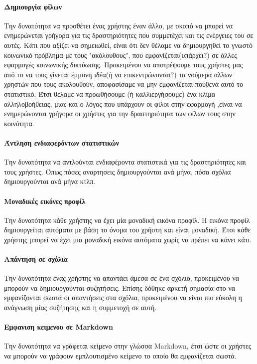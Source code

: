 \documentclass[acmtog, nonacm, language=english, language=greek]{acmart}
\newcommand{\en}[1]{\textlatin{#1}}
\begin{document}
\paragraph{Δημιουργία φίλων} Την δυνατότητα να προσθέτει ένας χρήστης έναν άλλο, με σκοπό να μπορεί να ενημερώνεται γρήγορα για τις δραστηριότητες που συμμετέχει και τις ενέργειες του σε αυτές. Κάτι που αξίζει να σημειωθεί, είναι ότι δεν θέλαμε να δημιουργηθεί το γνωστό κοινωνικό πρόβλημα με τους "ακόλουθους", που εμφανίζεται(υπάρχει?) σε άλλες εφαρμογές κοινωνικής δικτύωσης. Προκειμένου να αποτρέψουμε τους χρήστες μας από το να τους γίνεται έμμονη ιδέα(ή να επικεντρώνονται?) τα νούμερα αλλων χρηστών που τους ακολουθούν, αποφασίσαμε να μην εμφανίζεται πουθενά αυτό το στατιστικό. Έτσι θέλαμε να προωθήσουμε (ή καλλιεργήσουμε) ένα κλίμα αλληλοβοήθειας, μιας και ο λόγος που υπάρχουν οι φίλοι στην εφαρμογή ,είναι να ενημερώνονται γρήγορα οι χρήστες για την δραστηριότητα των φίλων τους στην κοινότητα.

\paragraph{Άντληση ενδιαφερόντων στατιστικών} Την δυνατότητα να αντλούνται ενδιαφέροντα στατιστικά για τις δραστηριότητες και τους χρήστες. Όπως πόσες αναρτησεις δημιουργούνται ανά μήνα, πόσα σχόλια δημιουργούνται ανά μήνα κτλπ.

\paragraph{Μοναδικές εικόνες προφίλ} Την δυνατότητα κάθε χρήστης να έχει μία μοναδική εικόνα προφίλ. Η εικόνα προφίλ  δημιουργείται αυτόματα με βάση το όνομα του χρήστη και είναι μοναδική. Έτσι κάθε χρήστης μπορεί να έχει μια μοναδική εικόνα αυτόματα χωρίς να πρέπει να κάνει κάτι.

\paragraph{Απάντηση σε σχόλια} Την δυνατότητα ένας χρήστης να απαντάει άμεσα σε ένα σχόλιο, προκειμένου να μπορούν να δημιουργούνται συζητήσεις. Επίσης δόθηκε αρκετή σημασία στο να εμφανίζονται σωστά οι απαντήσεις στα σχόλια, προκειμένου να είναι πιο εύκολη η ανάγνωση μίας συζήτησης και η συμμετοχή σε αυτή.

\paragraph{Εμφανιση κειμενου σε \en{Markdown}} Την δυνατότητα να γράφεται κείμενο στην γλώσσα \en{Markdown}, έτσι ώστε οι χρήστες να μπορούν να γράφουν εμπλουτισμένο κείμενο το οποίο θα εμφανίζεται σωστά.
\end{document}
